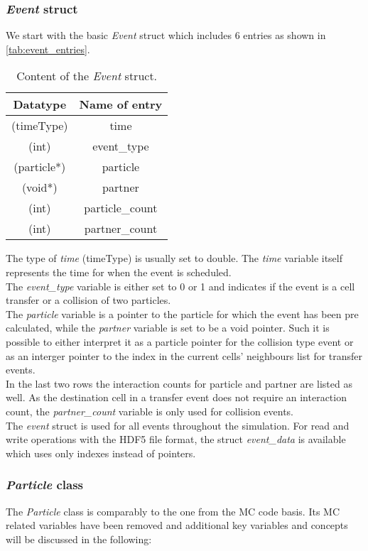 \subsubsection{\textit{Event} struct}
\label{sec:event_struct}
We start with the basic \textit{Event} struct which includes 6 entries as shown in \autoref{tab:event_entries}.
\begin{table}[h!]
\centering
\begin{tabular}{c|c}
\textbf{Datatype} & \textbf{Name of entry}\\ \hline
(timeType) & time \\
(int) & event\_type \\
(particle*)  & particle \\
(void*) & partner \\
(int) & particle\_count \\
(int) & partner\_count \\
\end{tabular}
\caption{Content of the \textit{Event} struct.}
\label{tab:event_entries}
\end{table}
The type of \textit{time} (timeType) is usually set to double. The \textit{time} variable itself represents the time for when the event is scheduled.\\ 
The \textit{event\_type} variable is either set to 0 or 1 and indicates if the event is a cell transfer or a collision of two particles.\\
The \textit{particle} variable is a pointer to the particle for which the event has been pre calculated, while the \textit{partner} variable is set to be a void pointer. Such it is possible to either interpret it as a particle pointer for the collision type event or as an interger pointer to the index in the current cells' neighbours list for transfer events.\\
In the last two rows the interaction counts for particle and partner are listed as well. As the destination cell in a transfer event does not require an interaction count, the \textit{partner\_count} variable is only used for collision events.\\

The \textit{event} struct is used for all events throughout the simulation. For read and write operations with the HDF5 file format, the struct \textit{event\_data} is available which uses only indexes instead of pointers.\\

\subsubsection{\textit{Particle} class}
\label{sec:particle_class}
The \textit{Particle} class is comparably to the one from the MC code basis. Its MC related variables have been removed and additional key variables and concepts will be discussed in the following:\\

